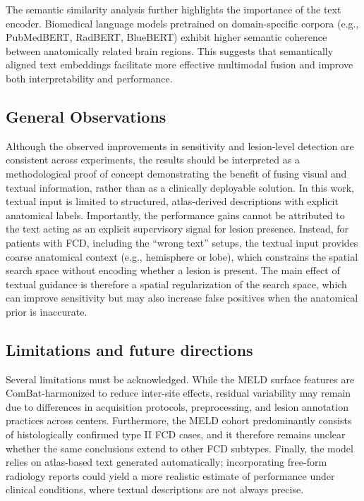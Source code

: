 \documentclass[FCD_GNN.tex]{subfiles}
\begin{document}
The semantic similarity analysis further highlights the importance of the text
encoder.
Biomedical language models pretrained on domain-specific corpora (e.g.,
PubMedBERT, RadBERT, BlueBERT) exhibit higher semantic coherence between
anatomically related brain regions.
This suggests that semantically aligned text embeddings facilitate more effective
multimodal fusion and improve both interpretability and performance.

\subsection*{General Observations}
Although the observed improvements in sensitivity and lesion-level detection are
consistent across experiments, the results should be interpreted as a
methodological proof of concept demonstrating the benefit of fusing visual and
textual information, rather than as a clinically deployable solution.
In this work, textual input is limited to structured, atlas-derived descriptions
with explicit anatomical labels. 
Importantly, the performance gains cannot be attributed to the text acting as an explicit
supervisory signal for lesion presence. Instead, for patients with FCD, including the
``wrong text'' setups, the textual input provides coarse anatomical context (e.g., hemisphere
or lobe), which constrains the spatial search space without encoding whether a lesion is
present. 
The main effect of textual guidance is therefore a spatial regularization of the
search space, which can improve sensitivity but may also increase false positives
when the anatomical prior is inaccurate.

\subsection*{Limitations and future directions}
Several limitations must be acknowledged. 
While the MELD surface features are ComBat-harmonized to reduce inter-site effects, residual variability may remain due to differences in acquisition protocols, preprocessing, and lesion annotation practices across centers.
Furthermore, the MELD cohort predominantly consists of histologically confirmed type II FCD cases, and it therefore remains unclear whether the same conclusions extend to other FCD subtypes.
Finally, the model relies on atlas-based text generated automatically; incorporating free-form radiology reports could yield a more realistic estimate of performance under clinical conditions, where textual descriptions are not always precise.
\end{document}
